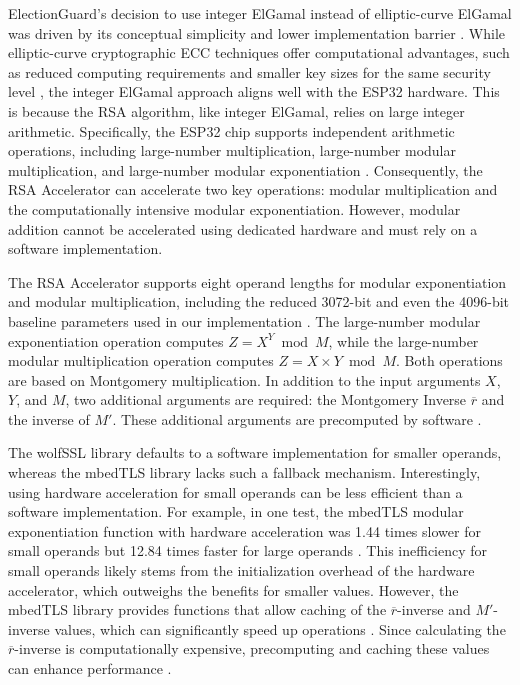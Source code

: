 ElectionGuard's decision to use integer ElGamal instead of elliptic-curve ElGamal was driven by its conceptual simplicity and lower implementation barrier \cite[7]{eg-paper}. While elliptic-curve cryptographic \ac{ECC} techniques offer computational advantages, such as reduced computing requirements and smaller key sizes for the same security level \cite[1, 6]{ecc-eval}, the integer ElGamal approach aligns well with the ESP32 hardware. This is because the RSA algorithm, like integer ElGamal, relies on large integer arithmetic. Specifically, the ESP32 chip supports independent arithmetic operations, including large-number multiplication, large-number modular multiplication, and large-number modular exponentiation \cite[32]{esp32-series} \cite[603]{esp32-ref}. Consequently, the RSA Accelerator can accelerate two key operations: modular multiplication and the computationally intensive modular exponentiation. However, modular addition cannot be accelerated using dedicated hardware and must rely on a software implementation.

The RSA Accelerator supports eight operand lengths for modular exponentiation and modular multiplication, including the reduced 3072-bit and even the 4096-bit baseline parameters used in our implementation \cite[598]{esp32-ref}. The large-number modular exponentiation operation computes \( Z = X^Y \bmod M \), while the large-number modular multiplication operation computes \( Z = X \times Y \bmod M \). Both operations are based on Montgomery multiplication. In addition to the input arguments \( X \), \( Y \), and \( M \), two additional arguments are required: the Montgomery Inverse \( \overline{r} \) and the inverse of \( M' \). These additional arguments are precomputed by software \cite[598-599]{esp32-ref}.

The wolfSSL library defaults to a software implementation for smaller operands, whereas the mbedTLS library lacks such a fallback mechanism. Interestingly, using hardware acceleration for small operands can be less efficient than a software implementation. For example, in one test, the mbedTLS modular exponentiation function with hardware acceleration was 1.44 times slower for small operands but 12.84 times faster for large operands \cite[51]{eval-crypto}. This inefficiency for small operands likely stems from the initialization overhead of the hardware accelerator, which outweighs the benefits for smaller values. However, the mbedTLS library provides functions that allow caching of the \( \overline{r} \)-inverse and \( M' \)-inverse values, which can significantly speed up operations \cite[51]{eval-crypto}. Since calculating the \( \overline{r} \)-inverse is computationally expensive, precomputing and caching these values can enhance performance \cite[51]{eval-crypto}.

